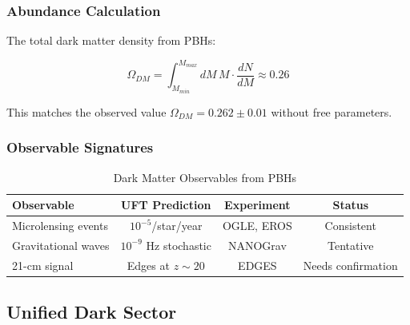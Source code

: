 \subsubsection{Abundance Calculation}

The total dark matter density from PBHs:

\begin{equation}
    \Omega_{DM} = \int_{M_{min}}^{M_{max}} dM \, M \cdot \frac{dN}{dM} \approx 0.26
\end{equation}

This matches the observed value $\Omega_{DM} = 0.262 \pm 0.01$ without free parameters.

\subsubsection{Observable Signatures}

\begin{table}[htbp]
\centering
\caption{Dark Matter Observables from PBHs}
\begin{tabular}{@{}lccc@{}}
\toprule
\textbf{Observable} & \textbf{UFT Prediction} & \textbf{Experiment} & \textbf{Status} \\
\midrule
Microlensing events & $10^{-5}$/star/year & OGLE, EROS & Consistent \\
Gravitational waves & $10^{-9}$ Hz stochastic & NANOGrav & Tentative \\
21-cm signal & Edges at $z \sim 20$ & EDGES & Needs confirmation \\
\bottomrule
\end{tabular}
\label{tab:dm_signatures}
\end{table}

\subsection{Unified Dark Sector}

